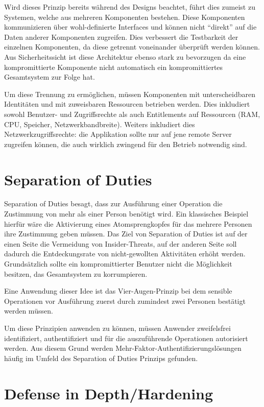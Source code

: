 Wird dieses Prinzip bereits während des Designs beachtet, führt dies zumeist zu Systemen, welche aus mehreren Komponenten bestehen. Diese Komponenten kommunizieren über wohl-definierte Interfaces und können nicht ``direkt'' auf die Daten anderer Komponenten zugreifen. Dies verbessert die Testbarkeit der einzelnen Komponenten, da diese getrennt voneinander überprüft werden können. Aus Sicherheitssicht ist diese Architektur ebenso stark zu bevorzugen da eine kompromittierte Komponente nicht automatisch ein kompromittiertes Gesamtsystem zur Folge hat.

Um diese Trennung zu ermöglichen, müssen Komponenten mit unterscheidbaren Identitäten und mit zuweisbaren Ressourcen betrieben werden. Dies inkludiert sowohl Benutzer- und Zugriffsrechte als auch Entitlements auf Ressourcen (RAM, CPU, Speicher, Netzwerkbandbreite). Weiters inkludiert dies Netzwerkzugriffsrechte: die Applikation sollte nur auf jene remote Server zugreifen können, die auch wirklich zwingend für den Betrieb notwendig sind.

\section{Separation of Duties}

Separation of Duties besagt, dass zur Ausführung einer Operation die Zustimmung von mehr als einer Person benötigt wird. Ein klassisches Beispiel hierfür wäre die Aktivierung eines Atomsprengkopfes für das mehrere Personen ihre Zustimmung geben müssen. Das Ziel von Separation of Duties ist auf der einen Seite die Vermeidung von Insider-Threats, auf der anderen Seite soll dadurch die Entdeckungsrate von nicht-gewollten Aktivitäten erhöht werden. Grundsätzlich sollte ein kompromittierter Benutzer nicht die Möglichkeit besitzen, das Gesamtsystem zu korrumpieren.

Eine Anwendung dieser Idee ist das Vier-Augen-Prinzip bei dem sensible Operationen vor Ausführung zuerst durch zumindest zwei Personen bestätigt werden müssen.

Um diese Prinzipien anwenden zu können, müssen Anwender zweifelsfrei identifiziert, authentifiziert und für die auszuführende Operationen autorisiert werden. Aus diesem Grund werden Mehr-Faktor-Authentifizierungslösungen häufig im Umfeld des Separation of Duties Prinzips gefunden.

\section{Defense in Depth/Hardening}

